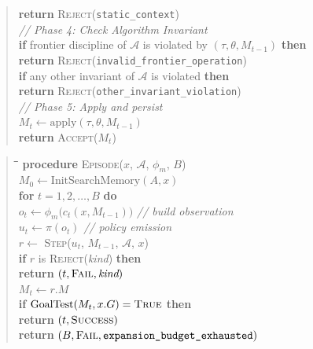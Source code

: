 \begin{quote}
\begin{tabbing}
\>\> \textbf{return} \textsc{Reject}(\texttt{static\_context}) \\[2pt]
\> \textit{// Phase 4: Check Algorithm Invariant} \\
\> \textbf{if} frontier discipline of $\mathcal{A}$ is violated by $(\tau, \theta, M_{t-1})$ \textbf{then} \\
\>\> \textbf{return} \textsc{Reject}(\texttt{invalid\_frontier\_operation}) \\
\> \textbf{if} any other invariant of $\mathcal{A}$ is violated \textbf{then} \\
\>\> \textbf{return} \textsc{Reject}(\texttt{other\_invariant\_violation}) \\[2pt]
\> \textit{// Phase 5: Apply and persist} \\
\> $M_t \leftarrow \mathrm{apply}(\tau, \theta, M_{t-1})$ \\
\> \textbf{return} \textsc{Accept}($M_t$)
\end{tabbing}
\end{quote}

\begin{quote}
\small
\begin{tabbing}
\hspace{1.5em}\=\hspace{1.5em}\=\hspace{1.5em}\=\kill
\textbf{procedure} \textsc{Episode}($x$, $\mathcal{A}$, $\phi_m$, $B$) \\
\> $M_0 \leftarrow \mathrm{InitSearchMemory}(A, x)$ \\
\> \textbf{for} $t = 1, 2, \ldots, B$ \textbf{do} \\
\>\> $o_t \leftarrow \phi_m\bigl(c_t(x, M_{t-1})\bigr)$ \hspace{2em} \textit{// build observation} \\
\>\> $u_t \leftarrow \pi(o_t)$ \hspace{6.4em} \textit{// policy emission} \\
\>\> $r \leftarrow$ \textsc{Step}($u_t$, $M_{t-1}$, $\mathcal{A}$, $x$) \\
\>\> \textbf{if} $r$ is \textsc{Reject}(\textit{kind}) \textbf{then} \\
\>\>\> \textbf{return} $(t, \textsc{Fail}, \textit{kind})$ \\
\>\> $M_t \leftarrow r.M$ \\
\>\> \textbf{if} $\mathrm{GoalTest}(M_t, x.G) = \textsc{True}$ \textbf{then} \\
\>\>\> \textbf{return} $(t, \textsc{Success})$ \\
\> \textbf{return} $(B, \textsc{Fail}, \texttt{expansion\_budget\_exhausted})$
\end{tabbing}
\end{quote}

